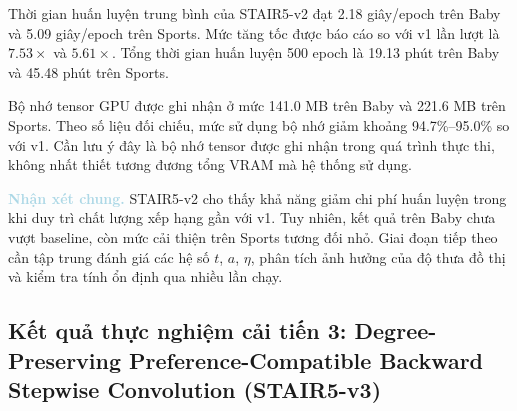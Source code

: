 \begin{table}[!htbp]
    \centering

    \caption{
        Chi phí tính toán của STAIR5-v2
        trên Amazon Baby và Amazon Sports.
    }
    \label{tab:stair5_v2_hardware}

    \footnotesize
    \renewcommand{\arraystretch}{1.15}
    \setlength{\tabcolsep}{4pt}

\end{table}

Thời gian huấn luyện trung bình của STAIR5-v2
đạt 2.18 giây/epoch trên Baby
và 5.09 giây/epoch trên Sports.
Mức tăng tốc được báo cáo so với v1
lần lượt là $7.53\times$ và $5.61\times$.
Tổng thời gian huấn luyện 500 epoch
là 19.13 phút trên Baby
và 45.48 phút trên Sports.

Bộ nhớ tensor GPU được ghi nhận ở mức
141.0 MB trên Baby và 221.6 MB trên Sports.
Theo số liệu đối chiếu, mức sử dụng bộ nhớ
giảm khoảng 94.7\%--95.0\% so với v1.
Cần lưu ý đây là bộ nhớ tensor được ghi nhận
trong quá trình thực thi, không nhất thiết
tương đương tổng VRAM mà hệ thống sử dụng.

\noindent\textcolor{lightblue}{\textbf{Nhận xét chung.}}
STAIR5-v2 cho thấy khả năng giảm chi phí huấn luyện
trong khi duy trì chất lượng xếp hạng gần với v1.
Tuy nhiên, kết quả trên Baby chưa vượt baseline,
còn mức cải thiện trên Sports tương đối nhỏ.
Giai đoạn tiếp theo cần tập trung đánh giá
các hệ số $t$, $a$, $\eta$,
phân tích ảnh hưởng của độ thưa đồ thị
và kiểm tra tính ổn định qua nhiều lần chạy.

\subsection{Kết quả thực nghiệm cải tiến 3: Degree-Preserving Preference-Compatible Backward Stepwise Convolution (STAIR5-v3)}

